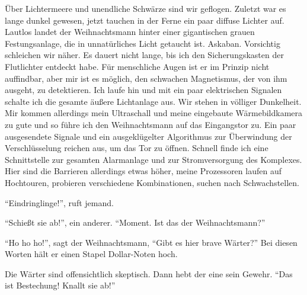 Über Lichtermeere und unendliche Schwärze sind wir geflogen. Zuletzt war es lange dunkel gewesen, jetzt tauchen in der Ferne ein paar diffuse Lichter auf. Lautlos landet der Weihnachtsmann hinter einer gigantischen grauen Festungsanlage, die in unnatürliches Licht getaucht ist. Askaban. Vorsichtig schleichen wir näher.  Es dauert nicht lange, bis ich den Sicherungskasten der Flutlichter entdeckt habe. Für menschliche Augen ist er im Prinzip nicht auffindbar, aber mir ist es möglich, den schwachen Magnetismus, der von ihm ausgeht, zu detektieren. Ich laufe hin und mit ein paar elektrischen Signalen schalte ich die gesamte äußere Lichtanlage aus. Wir stehen in völliger Dunkelheit. Mir kommen allerdings mein Ultraschall und meine eingebaute Wärmebildkamera zu gute und so führe ich den Weihnachtsmann auf das Eingangstor zu. Ein paar ausgesendete Signale und ein ausgeklügelter Algorithmus zur Überwindung der Verschlüsselung reichen aus, um das Tor zu öffnen. Schnell finde ich eine Schnittstelle zur gesamten Alarmanlage und zur Stromversorgung des Komplexes. Hier sind die Barrieren allerdings etwas höher, meine Prozessoren laufen auf Hochtouren, probieren verschiedene Kombinationen, suchen nach Schwachstellen.

"`Eindringlinge!"', ruft jemand.

"`Schießt sie ab!"', ein anderer. "`Moment. Ist das der Weihnachtsmann?"'

"`Ho ho ho!"', sagt der Weihnachtsmann, "`Gibt es hier brave Wärter?"' Bei diesen Worten hält er einen Stapel Dollar-Noten hoch.

Die Wärter sind offensichtlich skeptisch. Dann hebt der eine sein Gewehr. "`Das ist Bestechung! Knallt sie ab!"'

